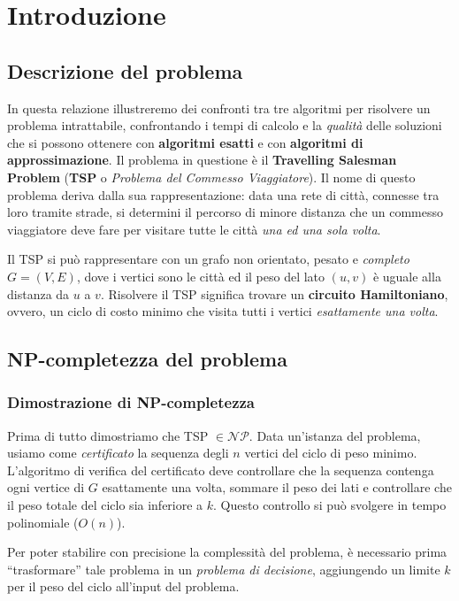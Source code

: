 \section{Introduzione}

\subsection{Descrizione del problema}

In questa relazione illustreremo dei confronti tra tre algoritmi per risolvere un problema
intrattabile, confrontando i tempi di calcolo e la \textit{qualità} delle soluzioni
che si possono ottenere con \textbf{algoritmi esatti} e con \textbf{algoritmi di approssimazione}.
Il problema in questione è il \textbf{Travelling Salesman Problem} (\textbf{TSP} o
\textit{Problema del Commesso Viaggiatore}). Il nome di questo problema deriva dalla sua
rappresentazione: data una rete di città, connesse tra loro tramite strade, si determini il
percorso di minore distanza che un commesso viaggiatore deve fare per visitare tutte le città
\textit{una ed una sola volta}.

Il TSP si può rappresentare con un grafo non orientato, pesato e
\textit{completo} $G = (V,E)$, dove i vertici sono le città ed il peso del lato $(u,v)$
è uguale alla distanza da $u$ a $v$. Risolvere il TSP significa trovare un
\textbf{circuito Hamiltoniano}, ovvero, un ciclo di costo minimo che visita tutti
i vertici \textit{esattamente una volta}.

\subsection{NP-completezza del problema}

\subsubsection{Dimostrazione di NP-completezza}

Prima di tutto dimostriamo che TSP $\in \mathcal{NP}$. Data un’istanza del problema, usiamo
come \textit{certificato} la sequenza degli $n$ vertici del ciclo di peso minimo.
L’algoritmo di verifica del certificato deve controllare che la sequenza contenga ogni
vertice di $G$ esattamente una volta, sommare il peso dei lati e controllare che il peso
totale del ciclo sia inferiore a $k$. Questo controllo si può svolgere in tempo polinomiale
($O(n)$).

Per poter stabilire con precisione la complessità del problema, è necessario prima
“trasformare” tale problema in un \textit{problema di decisione}, aggiungendo un limite $k$
per il peso del ciclo all’input del problema.

